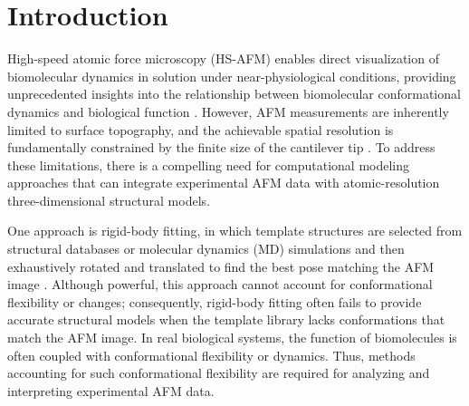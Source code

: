 \section{Introduction}

High-speed atomic force microscopy (HS-AFM) enables direct visualization of biomolecular dynamics in solution under near-physiological conditions, providing unprecedented insights into the relationship between biomolecular conformational dynamics and biological function \cite{ando_high-speed_2008, ando_high-speed_2022}. 
However, AFM measurements are inherently limited to surface topography, and the achievable spatial resolution is fundamentally constrained by the finite size of the cantilever tip \cite{villarrubia_algorithms_1997, matsunaga2023endtoend}. 
To address these limitations, there is a compelling need for computational modeling approaches that can integrate experimental AFM data with atomic-resolution three-dimensional structural models.

One approach is rigid-body fitting, in which template structures are selected from structural databases or molecular dynamics (MD) simulations and then exhaustively rotated and translated to find the best pose matching the AFM image \cite{ando_high-speed_2005, scheuring_structure_2005, scheuring_high-resolution_2007,asakawa_submolecular-scale_2011, trinh_computational_2012, chaves_conformational_2013, amyot_bioafmviewer_2020, amyot_simulation_2022, niina_rigid-body_2021}. 
Although powerful, this approach cannot account for conformational flexibility or changes; consequently, rigid-body fitting often fails to provide accurate structural models when the template library lacks conformations that match the AFM image. 
In real biological systems, the function of biomolecules is often coupled with conformational flexibility or dynamics. 
Thus, methods accounting for such conformational flexibility are required for analyzing and interpreting experimental AFM data.


